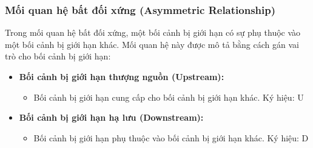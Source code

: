 













\subsubsection{Mối quan hệ bất đối xứng (Asymmetric Relationship)}









Trong mối quan hệ bất đối xứng, một bối cảnh bị giới hạn có sự phụ thuộc vào một bối cảnh bị giới hạn khác. Mối quan hệ này được mô tả bằng cách gán vai trò cho bối cảnh bị giới hạn:











\begin{itemize}

    \item \textbf{Bối cảnh bị giới hạn thượng nguồn (Upstream):}

          \begin{itemize}

              \item Bối cảnh bị giới hạn cung cấp cho bối cảnh bị giới hạn khác.  Ký hiệu: U

          \end{itemize}

    \item \textbf{Bối cảnh bị giới hạn hạ lưu (Downstream):}

          \begin{itemize}

              \item Bối cảnh bị giới hạn phụ thuộc vào bối cảnh bị giới hạn khác.  Ký hiệu: D

          \end{itemize}

\end{itemize}

